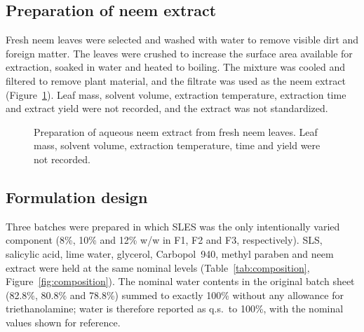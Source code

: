 \documentclass[10pt,a4paper,twocolumn]{article}
\begin{document}
\subsection{Preparation of neem extract}

Fresh neem leaves were selected and washed with water to remove visible
dirt and foreign matter. The leaves were crushed to increase the surface
area available for extraction, soaked in water and heated to boiling.
The mixture was cooled and filtered to remove plant material, and the
filtrate was used as the neem extract (Figure~\ref{fig:neemextract}).
Leaf mass, solvent volume, extraction temperature, extraction time and
extract yield were not recorded, and the extract was not standardized.

\begin{figure}[t]
\centering
{}
\caption{Preparation of aqueous neem extract from fresh neem leaves. Leaf
mass, solvent volume, extraction temperature, time and yield were not
recorded.}
\label{fig:neemextract}
\end{figure}

\subsection{Formulation design}

Three batches were prepared in which SLES was the only intentionally
varied component (8\%, 10\% and 12\% w/w in F1, F2 and F3,
respectively). SLS, salicylic acid, lime water, glycerol, Carbopol~940,
methyl paraben and neem extract were held at the same nominal levels
(Table~\ref{tab:composition}, Figure~\ref{fig:composition}). The nominal
water contents in the original batch sheet (82.8\%, 80.8\% and 78.8\%)
summed to exactly 100\% without any allowance for triethanolamine; water
is therefore reported as q.s.\ to 100\%, with the nominal values shown
for reference.
\end{document}
